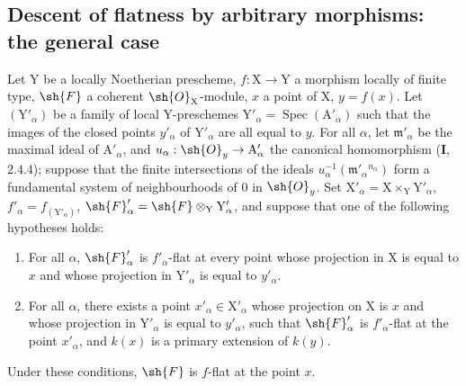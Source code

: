 \subsection{Descent of flatness by arbitrary morphisms: the general case}
\label{subsection:IV.11.5}

\begin{theorem}[11.5.1]
\label{IV.11.5.1}
Let $\mathrm{Y}$ be a locally Noetherian prescheme, $f:\mathrm{X}\to\mathrm{Y}$ a
morphism locally of finite type, $\sh{F}$ a coherent $\sh{O}_\mathrm{X}$-module, $x$ a point of $\mathrm{X}$, $y=f(x)$. Let $(\mathrm{Y}'_\alpha)$
be a family of local $\mathrm{Y}$-preschemes $\mathrm{Y}'_\alpha=\operatorname{Spec}(\mathrm{A}'_\alpha)$ such that the images of the closed points $y'_\alpha$
of $\mathrm{Y}'_\alpha$ are all equal to $y$. For all $\alpha$, let $\mathfrak{m}'_\alpha$ be the maximal ideal of $\mathrm{A}'_\alpha$, and $u_\alpha:\sh{O}_y\to\mathrm{A}'_\alpha$
the canonical homomorphism (\textbf{I},~$2.4.4$); suppose that the finite intersections of the ideals
$u_\alpha^{-1}(\mathfrak{m}'_\alpha{}^{n_\alpha})$
form a fundamental system of neighbourhoods of $0$ in $\sh{O}_y$. Set $\mathrm{X}'_\alpha=\mathrm{X}\times_\mathrm{Y}\mathrm{Y}'_\alpha$, $f'_\alpha=f_{(\mathrm{Y}'_\alpha)}$,
$\sh{F}'_\alpha=\sh{F}\otimes_\mathrm{Y}\mathrm{Y}'_\alpha$, and suppose that one of the following hypotheses holds:
\begin{enumerate}[label=(\roman*)]
  \item For all $\alpha$, $\sh{F}'_\alpha$ is $f'_\alpha$-flat at every point whose projection in $\mathrm{X}$ is equal
  to $x$ and whose projection in $\mathrm{Y}'_\alpha$ is equal to $y'_\alpha$.
  \item For all $\alpha$, there exists a point $x'_\alpha\in\mathrm{X}'_\alpha$ whose projection on $\mathrm{X}$ is $x$ and whose projection in $\mathrm{Y}'_\alpha$
  is equal to $y'_\alpha$, such that $\sh{F}'_\alpha$ is $f'_\alpha$-flat at the point $x'_\alpha$, and $k(x)$ is a primary extension of $k(y)$.
\end{enumerate}

Under these conditions, $\sh{F}$ is $f$-flat at the point $x$.
\end{theorem}

